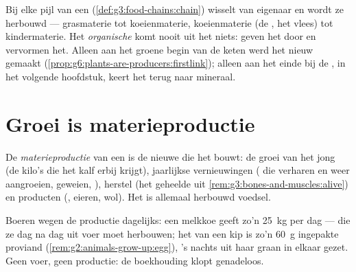 \begin{remark}\label{rem:g6:matter-from-food:hands}
Bij elke pijl van een 
(\cref{def:g3:food-chains:chain}) wisselt  van eigenaar
en wordt ze herbouwd --- grasmaterie tot koeienmaterie, koeienmaterie (de
, het vlees) tot kindermaterie. Het \emph{organische} komt nooit uit
het niets:  geven het door en vervormen het. Alleen aan het
groene begin van de keten werd het nieuw gemaakt
(\cref{prop:g6:plants-are-producers:firstlink}); alleen aan het einde bij
de , in het volgende hoofdstuk, keert het terug naar mineraal.
\end{remark}

\section{Groei is materieproductie}

\begin{definition}\label{def:g6:matter-from-food:production}
De \emph{materieproductie} van een  is de
nieuwe  die het bouwt: de groei van het jong (de
kilo's die het kalf erbij krijgt), jaarlijkse vernieuwingen ( die
verharen en weer aangroeien, geweien, ), herstel (het geheelde 
uit \cref{rem:g3:bones-and-muscles:alive}) en producten (, eieren,
wol). Het is allemaal herbouwd voedsel.
\end{definition}

\begin{example}\label{ex:g6:matter-from-food:weighing}
Boeren wegen de productie dagelijks: een melkkoe geeft zo'n
\qty{25}{kg}  per dag ---  die ze dag na dag uit
voer moet herbouwen; het  van een kip is zo'n \qty{60}{g} ingepakte
proviand (\cref{rem:g2:animals-grow-up:egg}), 's nachts uit haar graan
in elkaar gezet. Geen voer, geen productie: de boekhouding klopt
genadeloos.
\end{example}

